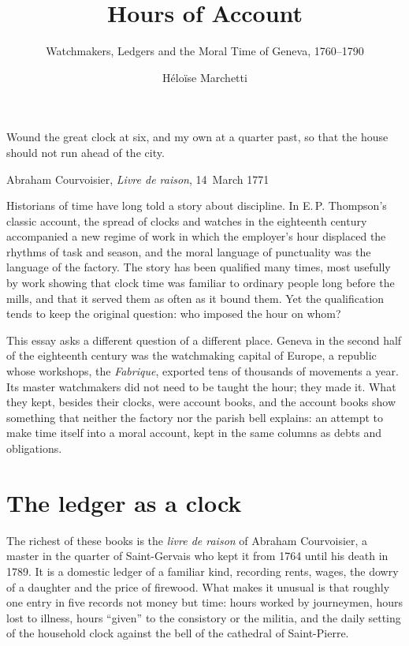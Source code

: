\documentclass[11pt]{article}
\title{Hours of Account}
\subtitle{Watchmakers, Ledgers and the Moral Time of Geneva, 1760--1790}
\author{Héloïse Marchetti}
\affiliation{Department of History, University of Edinburgh}
\begin{document}
\maketitle

\epigraph{Wound the great clock at six, and my own at a quarter past, so that
the house should not run ahead of the city.}{Abraham Courvoisier,
\textit{Livre de raison}, 14~March 1771}

\noindent Historians of time have long told a story about discipline. In
E.\,P. Thompson's classic account, the spread of clocks and watches in the
eighteenth century accompanied a new regime of work in which the employer's
hour displaced the rhythms of task and season, and the moral language of
punctuality was the language of the factory.\autocite{thompson1967} The story
has been qualified many times, most usefully by work showing that clock time
was familiar to ordinary people long before the mills, and that it served
them as often as it bound them.\autocite[1--24]{glennie2009} Yet the
qualification tends to keep the original question: who imposed the hour on
whom?

This essay asks a different question of a different place. Geneva in the
second half of the eighteenth century was the watchmaking capital of Europe,
a republic whose workshops, the \textit{Fabrique}, exported tens of thousands
of movements a year.\autocite[237--245]{landes1983} Its master watchmakers
did not need to be taught the hour; they made it. What they kept, besides
their clocks, were account books, and the account books show something that
neither the factory nor the parish bell explains: an attempt to make time
itself into a moral account, kept in the same columns as debts and
obligations.

\section{The ledger as a clock}

The richest of these books is the \textit{livre de raison} of Abraham
Courvoisier, a master in the quarter of Saint-Gervais who kept it from 1764
until his death in 1789.\autocite{courvoisier1771} It is a domestic ledger of
a familiar kind, recording rents, wages, the dowry of a daughter and the
price of firewood. What makes it unusual is that roughly one entry in five
records not money but time: hours worked by journeymen, hours lost to
illness, hours \enquote{given} to the consistory or the militia, and the
daily setting of the household clock against the bell of the cathedral of
Saint-Pierre.
\end{document}
